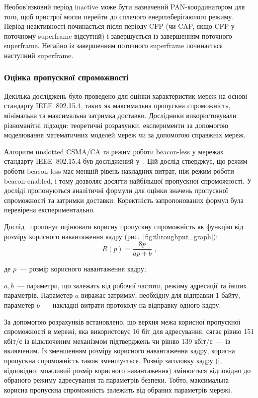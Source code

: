 \documentclass[a4paper,ukrainian,utf8,nocolumnsxix,floatsection,equationsection]{eskdtext}
\renewcommand\paragraph{\subsubsection}
\newcommand{\figref}[1]{рис.~\ref{#1}}
\newcommand{\iee}[0]{IEEE~802.15.4\xspace}
\newcommand{\csma}[0]{CSMA/CA\xspace}
\newcommand{\ucsma}[0]{unslotted \csma\xspace}
\newcommand{\blm}[0]{beacon-less\xspace}
\newcommand{\bem}[0]{beacon-enabled\xspace}
\begin{document}
Необов’язковий період inactive може бути назначений PAN-координатором для того, щоб пристрої могли перейти до сплячого енергозберігаючого режиму. Період неактивності починається після періоду CFP (чи CAP, якщо CFP у поточному superframe відсутній) і завершується із завершенням поточного superframe.
Негайно із завершенням поточного superframe починається наступний superframe. 

\paragraph{Оцінка пропускної спроможності}
\label{par:throughput:evaluation}

Декілька досліджень було проведено для оцінки характеристик мереж на основі стандарту \iee, таких як максимальна пропускна спроможність, мінімальна та максимальна затримка доставки. Дослідники використовували різноманітні підходи: теоретичні розрахунки, експерименти за допомогою моделювання математичних моделей мереж чи за допомогою справжніх мереж.

Алгоритм \ucsma та режим роботи \blm у мережах стандарту \iee був досліджений у~\cite{thoroughput:analysis:unslotted:ieee}. Цій дослід стверджує, що режим роботи \blm має меншій рівень накладних витрат, ніж режим роботи \bem, і тому дозволяє досягти найбільшої пропускної спроможності. У досліді пропонуються аналітичні формули для оцінки значень пропускної спроможності та затримки доставки. Коректність запропонованих формул була перевірена експериментально.

Дослід~\cite{thoroughput:analysis:unslotted:ieee} пропонує оцінювати корисну пропускну спроможність як функцію від розміру корисного навантаження кадру (\figref{fig:throughput_graph}):
\begin{equation}\label{eq:throughput}
	R(p) = \frac{8p}{ap + b} \text{ ,}
\end{equation}

де $p$~--- розмір корисного навантаження кадру;

$a,b$~--- параметри, що залежать від робочої частоти, режиму адресації та інших параметрів. Параметер $a$ виражає затримку, необхідну для відправки 1 байту, параметер $b$~--- накладні витрати протоколу на відправку одного кадру.


За допомогою розрахунків встановлено, що верхня межа корисної пропускної спроможності в мережі, яка використовує 16 біт для адресування, сягає рівню 151 кбіт/с із відключеним механізмом підтверджень чи рівню 139 кбіт/с~--- із включеним. Із зменшенням розміру корисного навантаження кадру, корисна пропускна спроможність також зменшується. Розмір заголовку кадру (і, відповідно, можливий розмір корисного навантаження) змінюється відповідно до обраного режиму адресування та параметрів безпеки. Тобто, максимальна корисна пропускна спроможність залежить від обраних параметрів мережі.
\end{document}
